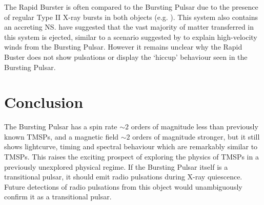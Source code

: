 %
%

%
%

\par The Rapid Burster is often compared to the Bursting Pulsar due to the presence of regular Type II X-ray bursts in both objects (e.g. \citealp{Lewin_BP}). This system also contains an accreting NS. \citealp{Iaria_RB} have suggested that the vast majority of matter transferred in this system is ejected, similar to a scenario suggested by \citealp{Degenaar_BPSpec} to explain high-velocity winds from the Bursting Pulsar. However it remains unclear why the Rapid Buster does not show pulsations or display the `hiccup' behaviour seen in the Bursting Pulsar.

\section{Conclusion}

\par The Bursting Pulsar has a spin rate $\sim2$ orders of magnitude less than previously known TMSPs, and a magnetic field $\sim2$ orders of magnitude stronger, but it still shows lightcurve, timing and spectral behaviour which are remarkably similar to TMSPs. This raises the exciting prospect of exploring the physics of TMSPs in a previously unexplored physical regime. If the Bursting Pulsar itself is a transitional pulsar, it should emit radio pulsations during X-ray quiescence. Future detections of radio pulsations from this object would unambiguously confirm it as a transitional pulsar.
